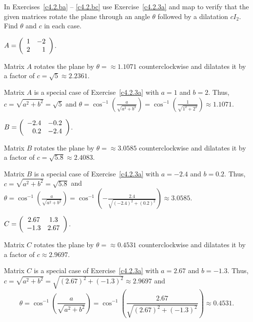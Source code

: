 \documentclass{ximera}
\begin{document}
\noindent In Exercises~\ref{c4.2.ba} -- \ref{c4.2.bc} use
Exercise~\ref{c4.2.3a} and {\sf map} to verify that the given matrices
rotate the plane through an angle $\theta$ followed by a dilatation $cI_2$.
Find $\theta$ and $c$ in each case.
\begin{exercise}  \label{c4.2.ba}
$A=\left(\begin{array}{rr} 1 & -2\\ 2 &1\end{array}\right)$.

\begin{solution}
\ans Matrix $A$ rotates the plane by $\theta =
\approx 1.1071$ counterclockwise and dilatates it by a factor of
$c = \sqrt{5} \approx 2.2361$.

\soln Matrix $A$ is a special case of Exercise~\ref{c4.2.3a} with $a = 1$
and $b = 2$.  Thus, $c = \sqrt{a^2 + b^2} = \sqrt{5}$ and
$\theta = \cos^{-1}\left(\frac{a}{\sqrt{a^2 + b^2}}\right) =
\cos^{-1}\left(\frac{1}{\sqrt{1^2 + 2^2}}\right) \approx 1.1071$.

\end{solution}
\end{exercise}
\begin{exercise}  \label{c4.2.bb}
$B=\left(\begin{array}{rr} -2.4 & -0.2\\ 0.2 &-2.4\end{array}\right)$.

\begin{solution}
\ans Matrix $B$ rotates the plane by $\theta =
\approx 3.0585$ counterclockwise and dilatates it by a factor of
$c = \sqrt{5.8} \approx 2.4083$.

\soln Matrix $B$ is a special case of Exercise~\ref{c4.2.3a} with $a = -2.4$
and $b = 0.2$.  Thus, $c = \sqrt{a^2 + b^2} = \sqrt{5.8}$ and
$\theta = \cos^{-1}\left(\frac{a}{\sqrt{a^2 + b^2}}\right) =
\cos^{-1}\left(-\frac{2.4}{\sqrt{(-2.4)^2 + (0.2)^2}}\right) \approx 3.0585$.

\end{solution}
\end{exercise}
\begin{exercise}  \label{c4.2.bc}
$C=\left(\begin{array}{cc} 2.67 & 1.3\\ -1.3 &2.67\end{array}\right)$.

\begin{solution}
\ans Matrix $C$ rotates the plane by $\theta =
\approx 0.4531$ counterclockwise and dilatates it by a factor of
$c \approx 2.9697$.

\soln Matrix $C$ is a special case of Exercise~\ref{c4.2.3a} with $a = 2.67$
and $b = -1.3$.  Thus, $c = \sqrt{a^2 + b^2} = \sqrt{(2.67)^2 + (-1.3)^2}
\approx 2.9697$ and
\[
\theta = \cos^{-1}\left(\frac{a}{\sqrt{a^2 + b^2}}
\right) = \cos^{-1}\left(\frac{2.67}{\sqrt{(2.67)^2 + (-1.3)^2}}\right)
\approx 0.4531.
\]

\end{solution}
\end{exercise}
\end{document}
